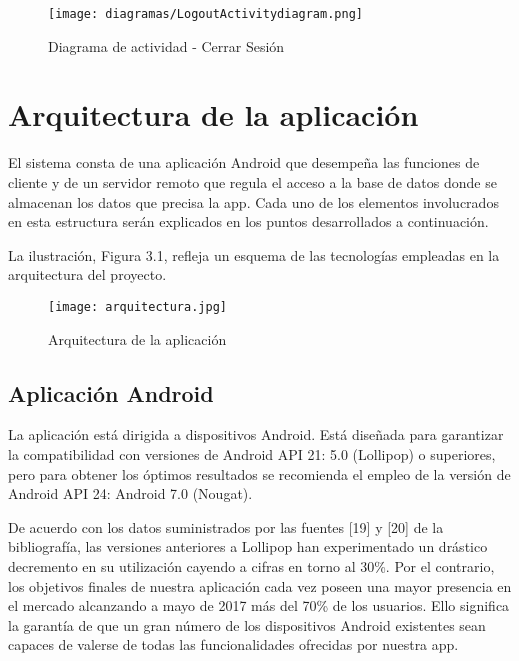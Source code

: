\documentclass[11pt,spanish,
		listoftables,listoffigures]
		{tfgplantilla}
\begin{document}
\begin{figure}[H]
\centering
\texttt{[image: diagramas/LogoutActivitydiagram.png]}
\caption{Diagrama de actividad -  Cerrar Sesión}
\end{figure}


\chapter{Arquitectura de la aplicaci\'on}

El sistema consta de una aplicación Android que desempeña las funciones de cliente y de un servidor remoto que regula el acceso a la base de datos donde se almacenan los datos que precisa la app. Cada uno de los elementos involucrados en esta estructura serán explicados en los puntos desarrollados a continuación.

La ilustración, Figura 3.1, refleja un esquema de las tecnologías empleadas en la arquitectura del proyecto.

\begin{figure}[H]
\centering
\texttt{[image: arquitectura.jpg]}
\caption{Arquitectura de la aplicación}
\end{figure}

\newpage
\section {Aplicación Android}

La aplicación está dirigida a dispositivos Android. Está diseñada para garantizar la compatibilidad con versiones de Android API 21: 5.0 (Lollipop) o superiores, pero para obtener los óptimos resultados se recomienda el empleo de la versión de Android API 24: Android 7.0 (Nougat). 

De acuerdo con los datos suministrados por las fuentes [19] y [20] de la bibliografía, las versiones anteriores a Lollipop han experimentado un drástico decremento en su utilización cayendo a cifras en torno al 30\%. Por el contrario, los objetivos finales de nuestra aplicación cada vez poseen una mayor presencia en el mercado alcanzando a mayo de 2017 más del 70\% de los usuarios. Ello significa la garantía de que un gran número de los dispositivos Android existentes sean capaces de valerse de todas las funcionalidades ofrecidas por nuestra app.
\end{document}
